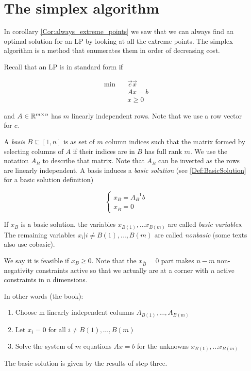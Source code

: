\section{The simplex algorithm}

In corollary \ref{Cor:always_extreme_points} we saw that we can always find an optimal solution for an LP by looking at all the extreme points. The simplex algorithm is a method that enumerates them in order of decreasing cost. 

Recall that an LP is in standard form if

\begin{align*}
\min \quad & \vec c\vec x\\
&Ax = b\\
&x\geq 0
\end{align*}

and $A\in \mathbb{R}^{m\times n}$ has $m$ linearly independent rows. Note that we use a row vector for $c$.

A \emph{basis} $B\subseteq [1,n]$ is as set of $m$ column indices such that the matrix formed by selecting columns of $A$ if their indices are in $B$ has full rank $m$. We use the notation $A_B$ to describe that matrix. Note that $A_B$ can be inverted as the rows are linearly independent. A basis induces a \emph{basic solution} (see \ref{Def:BasicSolution} for a basic solution definition)

\[\begin{cases} x_B = A^{-1}_Bb\\ x_{\bar B} = 0\end{cases}\]

If $x_B$ is a basic solution, the variables $x_{B(1)},...x_{B(m)}$ are called \emph{basic variables}. The remaining variables $x_i|i \neq B(1),...,B(m)$ are called \emph{nonbasic} (some texts also use cobasic). 

We say it is feasible if $x_B\geq 0$. Note that the $x_{\bar B}=0$ part makes $n-m$ non-negativity constraints active so that we actually are at a corner with $n$ active constraints in $n$ dimensions.

In other words (the book):
\begin{enumerate} 
 \item Choose m linearly independent columns $A_{B(1)},...,A_{B(m)}$
 \item Let $x_i=0$ for all $i \neq B(1),...,B(m)$
 \item Solve the system of $m$ equations $Ax=b$ for the unknowns $x_{B(1)},...x_{B(m)}$
\end{enumerate}
The basic solution is given by the results of step three.

